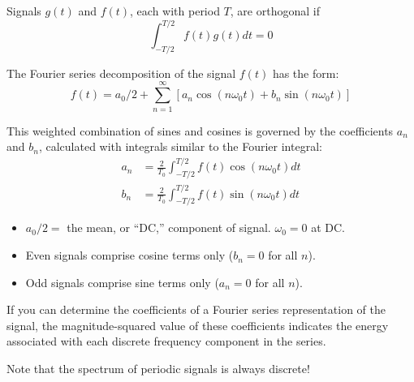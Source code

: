 \documentclass[11pt]{report}
\begin{document}
Signals $g(t)$ and $f(t)$, each with period $T$, are orthogonal if
\begin{equation*}
\int^{T/2}_{-T/2}f(t)g(t)dt = 0
\end{equation*}

The Fourier series decomposition of the signal $f(t)$ has the form:
\begin{equation*}
f(t) = a_{0}/2 + \sum^{\infty}_{n=1}[a_{n}\cos(n\omega_{0}t)+b_{n}\sin(n\omega_{0}t)]
\end{equation*}

This weighted combination of sines and cosines is governed by the coefficients
$a_{n}$ and $b_{n}$, calculated with integrals similar to the Fourier integral:
\begin{equation*}
\begin{split}
a_{n}&=\frac{2}{T_{0}}\int^{T/2}_{-T/2}f(t)\cos(n\omega_{0}t)dt\\
b_{n}&=\frac{2}{T_{0}}\int^{T/2}_{-T/2}f(t)\sin(n\omega_{0}t)dt
\end{split}
\end{equation*}

\begin{itemize}
\item $a_{0}/2 =$  the mean, or ``DC,'' component of signal. $\omega_{0} = 0$ at DC.

\item Even signals comprise cosine terms only ($b_{n}=0$ for all $n$).

\item Odd signals comprise sine terms only ($a_{n}=0$ for all $n$).
\end{itemize}

If you can determine the coefficients of a Fourier series
representation of the signal, the magnitude-squared value of these
coefficients indicates the energy associated with each discrete
frequency component in the series.

Note that the spectrum of periodic signals is always discrete!
\end{document}
